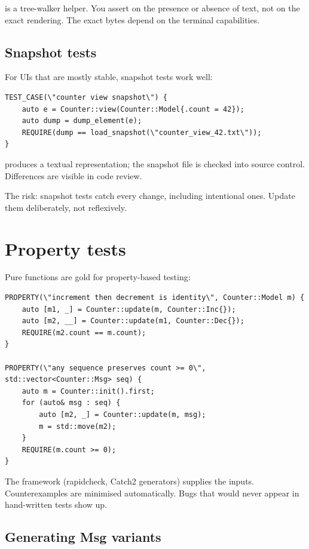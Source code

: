  is a tree-walker helper. You assert on the presence
or absence of text, not on the exact rendering. The exact bytes
depend on the terminal capabilities.

\subsection*{Snapshot tests}

For UIs that are mostly stable, snapshot tests work well:

\begin{lstlisting}
TEST_CASE(\"counter view snapshot\") {
    auto e = Counter::view(Counter::Model{.count = 42});
    auto dump = dump_element(e);
    REQUIRE(dump == load_snapshot(\"counter_view_42.txt\"));
}
\end{lstlisting}

 produces a textual representation; the
snapshot file is checked into source control. Differences are
visible in code review.

The risk: snapshot tests catch every change, including
intentional ones. Update them deliberately, not reflexively.

\section{Property tests}

Pure functions are gold for property-based testing:

\begin{lstlisting}
PROPERTY(\"increment then decrement is identity\", Counter::Model m) {
    auto [m1, _] = Counter::update(m, Counter::Inc{});
    auto [m2, __] = Counter::update(m1, Counter::Dec{});
    REQUIRE(m2.count == m.count);
}

PROPERTY(\"any sequence preserves count >= 0\", std::vector<Counter::Msg> seq) {
    auto m = Counter::init().first;
    for (auto& msg : seq) {
        auto [m2, _] = Counter::update(m, msg);
        m = std::move(m2);
    }
    REQUIRE(m.count >= 0);
}
\end{lstlisting}

The framework (rapidcheck, Catch2 generators) supplies the
inputs. Counterexamples are minimised automatically. Bugs that
would never appear in hand-written tests show up.

\subsection*{Generating Msg variants}

